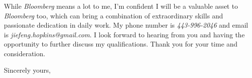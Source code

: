 \documentclass[11pt]{letter} %
\newcommand{\company}{\emph{Bloomberg}}
\begin{document}
\begin{letter}{
}
While \company{} means a lot to me, I'm confident I will be a valuable asset to \company{} too, which can bring a
combination of extraordinary skills and passionate dedication in daily work. 
My phone number is \emph{443-996-2046} and email is \emph{jiefeng.hopkins@gmail.com}. I look forward to hearing from you and having the opportunity to further discuss my qualifications.  Thank you for your time and consideration.


%
% 
%
\closing{Sincerely yours,}


\end{letter}
\end{document}

